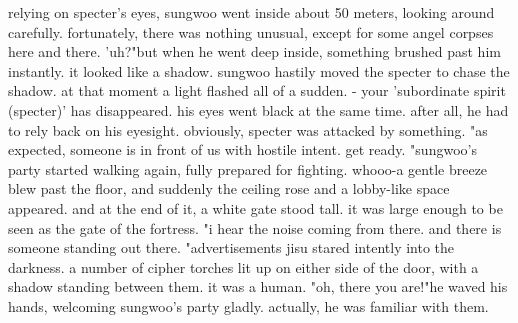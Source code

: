 relying on specter's eyes, sungwoo went inside about 50 meters, looking around carefully.
 fortunately, there was nothing unusual, except for some angel corpses here and there.
'uh?"but when he went deep inside, something brushed past him instantly.
 it looked like a shadow.
 sungwoo hastily moved the specter to chase the shadow.
 at that moment a light flashed all of a sudden.
 - your 'subordinate spirit (specter)' has disappeared.
his eyes went black at the same time.
 after all, he had to rely back on his eyesight.
obviously, specter was attacked by something.
"as expected, someone is in front of us with hostile intent.
 get ready.
"sungwoo's party started walking again, fully prepared for fighting.
 whooo-a gentle breeze blew past the floor, and suddenly the ceiling rose and a lobby-like space appeared.
 and at the end of it, a white gate stood tall.
 it was large enough to be seen as the gate of the fortress.
"i hear the noise coming from there.
 and there is someone standing out there.
"advertisements    jisu stared intently into the darkness.
a number of cipher torches lit up on either side of the door, with a shadow standing between them.
 it was a human.
 "oh, there you are!"he waved his hands, welcoming sungwoo's party gladly.
 actually, he was familiar with them.


 